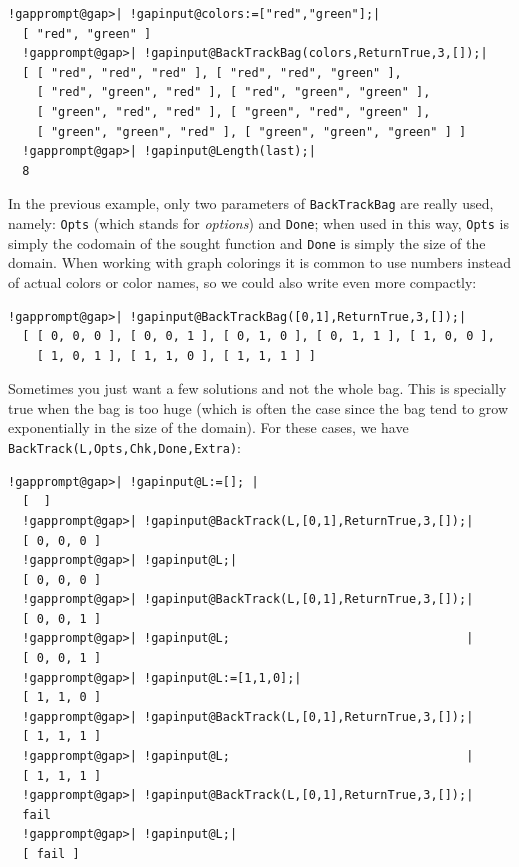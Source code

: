 \documentclass[a4paper,11pt]{report}
\begin{document}
{{ 
\begin{Verbatim}[commandchars=!@|,fontsize=\small,frame=single,label=Example]
  !gapprompt@gap>| !gapinput@colors:=["red","green"];|
  [ "red", "green" ]
  !gapprompt@gap>| !gapinput@BackTrackBag(colors,ReturnTrue,3,[]);|
  [ [ "red", "red", "red" ], [ "red", "red", "green" ], 
    [ "red", "green", "red" ], [ "red", "green", "green" ], 
    [ "green", "red", "red" ], [ "green", "red", "green" ], 
    [ "green", "green", "red" ], [ "green", "green", "green" ] ]
  !gapprompt@gap>| !gapinput@Length(last);|
  8
\end{Verbatim}
 

In the previous example, only two parameters of \texttt{BackTrackBag} are really used, namely: \texttt{Opts} (which stands for \emph{options}) and \texttt{Done}; when used in this way, \texttt{Opts} is simply the codomain of the sought function and \texttt{Done} is simply the size of the domain. When working with graph colorings it is
common to use numbers instead of actual colors or color names, so we could
also write even more compactly: 

 
\begin{Verbatim}[commandchars=!@|,fontsize=\small,frame=single,label=Example]
  !gapprompt@gap>| !gapinput@BackTrackBag([0,1],ReturnTrue,3,[]);|
  [ [ 0, 0, 0 ], [ 0, 0, 1 ], [ 0, 1, 0 ], [ 0, 1, 1 ], [ 1, 0, 0 ], 
    [ 1, 0, 1 ], [ 1, 1, 0 ], [ 1, 1, 1 ] ]
\end{Verbatim}
 

Sometimes you just want a few solutions and not the whole bag. This is
specially true when the bag is too huge (which is often the case since the bag
tend to grow exponentially in the size of the domain). For these cases, we
have \texttt{BackTrack(L,Opts,Chk,Done,Extra)}: 

 
\begin{Verbatim}[commandchars=!@|,fontsize=\small,frame=single,label=Example]
  !gapprompt@gap>| !gapinput@L:=[]; |
  [  ]
  !gapprompt@gap>| !gapinput@BackTrack(L,[0,1],ReturnTrue,3,[]);|
  [ 0, 0, 0 ]
  !gapprompt@gap>| !gapinput@L;|
  [ 0, 0, 0 ]
  !gapprompt@gap>| !gapinput@BackTrack(L,[0,1],ReturnTrue,3,[]);|
  [ 0, 0, 1 ]
  !gapprompt@gap>| !gapinput@L;                                 |
  [ 0, 0, 1 ]
  !gapprompt@gap>| !gapinput@L:=[1,1,0];|
  [ 1, 1, 0 ]
  !gapprompt@gap>| !gapinput@BackTrack(L,[0,1],ReturnTrue,3,[]);|
  [ 1, 1, 1 ]
  !gapprompt@gap>| !gapinput@L;                                 |
  [ 1, 1, 1 ]
  !gapprompt@gap>| !gapinput@BackTrack(L,[0,1],ReturnTrue,3,[]);|
  fail
  !gapprompt@gap>| !gapinput@L;|
  [ fail ]
\end{Verbatim}
 

}}
\end{document}

